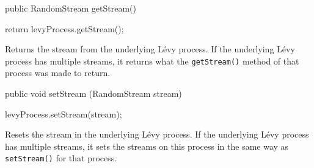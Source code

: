 \begin{code}

   public RandomStream getStream() \begin{hide} {
        return levyProcess.getStream();
    }\end{hide}
\end{code}
\begin{tabb} Returns the stream from the underlying L\'evy process.
If the underlying L\'evy process has multiple streams, it returns
what the \texttt{getStream()} method of that process was made to return.
\end{tabb}
\begin{code}

   public void setStream (RandomStream stream) \begin{hide} {
        levyProcess.setStream(stream);
    }\end{hide}
\end{code}
\begin{tabb} Resets the stream in the underlying L\'evy process.
If the underlying L\'evy process has multiple streams, it sets
the streams on this process in the same way as \texttt{setStream()}
for that process.
\end{tabb}
\begin{code}
\begin{hide}
}
\end{hide}
\end{code}
